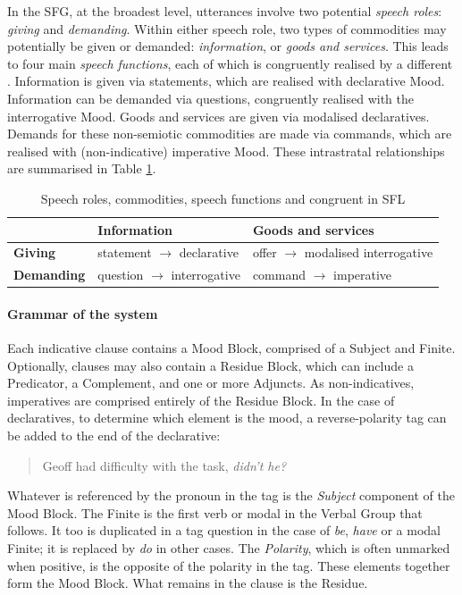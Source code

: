In the \gls{SFG}, at the broadest level, utterances involve two potential \emph{speech roles}: \emph{giving} and \emph{demanding}. Within either speech role, two types of commodities may potentially be given or demanded: \emph{information}, or \emph{goods and services}. This leads to four main \emph{speech functions}, each of which is congruently realised by a different . Information is given via statements, which are realised with declarative Mood. Information can be demanded via questions, congruently realised with the interrogative Mood. Goods and services are given via modalised declaratives. Demands for these non\hyp{}semiotic commodities are made via commands, which are realised with (non-indicative) imperative Mood. These intrastratal relationships are summarised in Table \ref{tab:roles}.

\begin{table}[htb]
\centering\small
\begin{tabular}{lll}

\toprule
\textbf{} & \textbf{Information} & \textbf{Goods and services} \\ 
\midrule
\textbf{Giving}   & statement $\rightarrow$ declarative    & offer $\rightarrow$ modalised interrogative     \\ 
\textbf{Demanding}   & question $\rightarrow$ interrogative & command $\rightarrow$ imperative    \\
\bottomrule
\end{tabular}
\caption[Mood Type and Speech Function]{Speech roles, commodities, speech functions and congruent  in SFL}
\label{tab:roles}
\end{table}   

\paragraph{Grammar of the  system} \label{sect:mood-grammar}

Each indicative clause contains a Mood Block, comprised of a Subject and Finite. Optionally, clauses may also contain a Residue Block, which can include a Predicator, a Complement, and one or more Adjuncts. As non-indicatives, imperatives are comprised entirely of the Residue Block. In the case of declaratives, to determine which element is the mood, a reverse-polarity tag can be added to the end of the declarative:

\begin{quote}
Geoff had difficulty with the task, \emph{didn't he?}
\end{quote}
%
Whatever is referenced by the pronoun in the tag is the \emph{Subject} component of the Mood Block. The Finite is the first verb or modal in the Verbal Group that follows. It too is duplicated in a tag question in the case of \emph{be}, \emph{have} or a modal Finite; it is replaced by \emph{do} in other cases. The \emph{Polarity}, which is often unmarked when positive, is the opposite of the polarity in the tag. These elements together form the Mood Block. What remains in the clause is the Residue.


